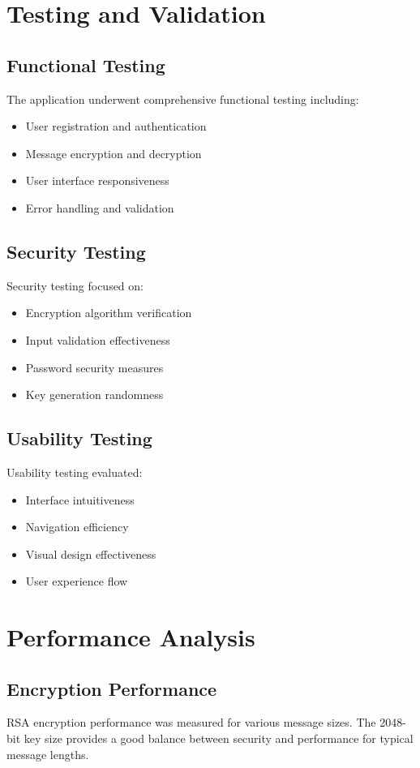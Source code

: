 \documentclass[12pt,a4paper]{article}
\begin{document}
\section{Testing and Validation}

\subsection{Functional Testing}
The application underwent comprehensive functional testing including:
\begin{itemize}
    \item User registration and authentication
    \item Message encryption and decryption
    \item User interface responsiveness
    \item Error handling and validation
\end{itemize}

\subsection{Security Testing}
Security testing focused on:
\begin{itemize}
    \item Encryption algorithm verification
    \item Input validation effectiveness
    \item Password security measures
    \item Key generation randomness
\end{itemize}

\subsection{Usability Testing}
Usability testing evaluated:
\begin{itemize}
    \item Interface intuitiveness
    \item Navigation efficiency
    \item Visual design effectiveness
    \item User experience flow
\end{itemize}

\section{Performance Analysis}

\subsection{Encryption Performance}
RSA encryption performance was measured for various message sizes. The 2048-bit key size provides a good balance between security and performance for typical message lengths.
\end{document}
